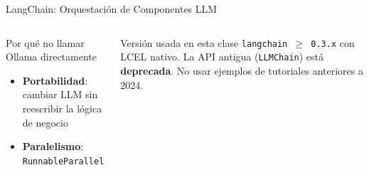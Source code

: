 \documentclass[aspectratio=169]{beamer}
\begin{document}
\begin{frame}{LangChain: Orquestación de Componentes LLM}
\begin{columns}
\begin{exampleblock}{Por qué no llamar Ollama directamente}
\begin{itemize}
        \item \textbf{Portabilidad}: cambiar LLM sin reescribir la lógica de negocio
        \item \textbf{Paralelismo}: \texttt{RunnableParallel}
      \end{itemize}
    \end{exampleblock}
    \vspace{0.3em}
    \begin{alertblock}{Versión usada en esta clase}
      \texttt{langchain $\geq$ 0.3.x} con LCEL nativo.
      La API antigua (\texttt{LLMChain}) está \textbf{deprecada}.
      No usar ejemplos de tutoriales anteriores a 2024.
    \end{alertblock}
  \end{columns}
\end{frame}
\end{document}
